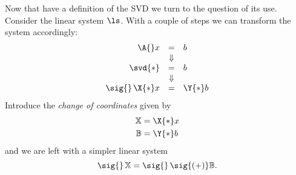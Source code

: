 Now that have a definition of the SVD we turn to the question of its use. Consider the linear system $\ls$. With a couple of steps we can transform the system accordingly:
\begin{equation}
  \begin{array}{rcl}
  \A{}x &=& b \\
   &\Downarrow\\
   \svd{*} &=& b\\
   &\Downarrow\\
   \sig{}\, \X{*} x &=& \Y{*} b
  \end{array}
\end{equation}
Introduce the \textit{change of coordinates} given by
\begin{equation}
  \begin{split}
    \mathbb{X} & = \X{*} x  \\
    \mathbb{B} & = \Y{*} b
  \end{split}
\end{equation}
and we are left with a simpler linear system
\begin{equation}
    \sig{}\, \mathbb{X} = \sig{}\,\sig{(+)}\mathbb{B}.
    \label{eq:formal:svdsoln}
\end{equation}

